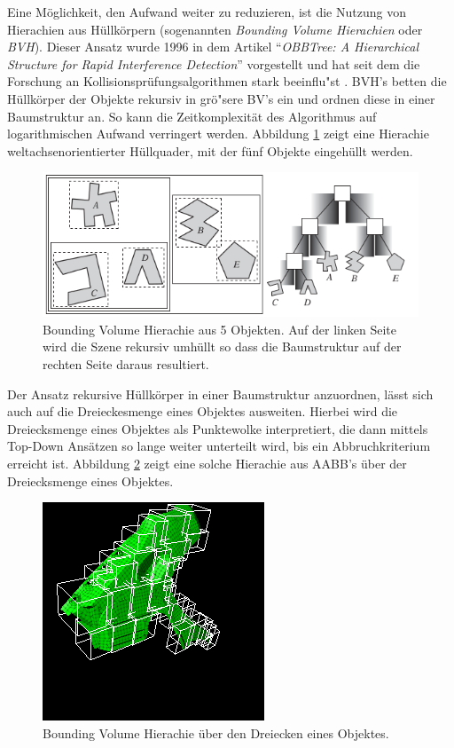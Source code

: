 Eine M\"oglichkeit, den Aufwand weiter zu reduzieren, ist die Nutzung von Hierachien aus H\"ullk\"orpern (sogenannten {\em Bounding Volume Hierachien} oder {\em BVH}). Dieser Ansatz wurde 1996 in dem Artikel "`{\em OBBTree: A Hierarchical Structure for Rapid Interference Detection}"' vorgestellt und hat seit dem die Forschung an Kollisionspr\"ufungsalgorithmen stark beeinflu"st \cite{Gottschalk}. BVH's betten die H\"ullk\"orper der Objekte rekursiv in gr\"o"sere BV's ein und ordnen diese in einer Baumstruktur an. So kann die Zeitkomplexit\"at des Algorithmus auf logarithmischen Aufwand verringert werden. Abbildung \ref{bvh} zeigt eine Hierachie weltachsenorientierter H\"ullquader, mit der f\"unf Objekte eingeh\"ullt werden.

\begin{figure}[H]
\centerline{
	\includegraphics[scale=0.60]{graphics/bvh.png}
}
\caption{Bounding Volume Hierachie aus 5 Objekten. Auf der linken Seite wird
die Szene rekursiv umh\"ullt so dass die Baumstruktur auf der rechten Seite
daraus resultiert. }
\label{bvh}
\end{figure}

Der Ansatz rekursive H\"ullk\"orper in einer Baumstruktur anzuordnen, l\"asst
sich auch auf die Dreieckesmenge eines Objektes ausweiten. Hierbei wird die
Dreiecksmenge eines Objektes als Punktewolke interpretiert, die dann mittels
Top-Down Ans\"atzen so lange weiter unterteilt wird, bis ein Abbruchkriterium
erreicht ist. Abbildung \ref{bvho} zeigt eine solche Hierachie aus AABB's \"uber
der Dreiecksmenge eines Objektes.

\begin{figure}[H]
\centerline{
	\includegraphics[scale=0.7]{graphics/BV-Hierarchie5.png}
}
\caption{Bounding Volume Hierachie \"uber den Dreiecken eines Objektes.}
\label{bvho}
\end{figure}

